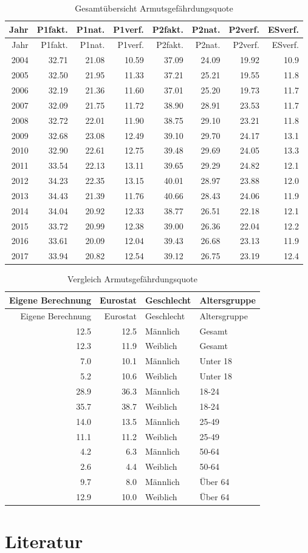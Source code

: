 \documentclass[12pt,]{article}
\begin{document}
\begin{longtable}[]{@{}rrrrrrrr@{}}
\caption{Gesamtübersicht Armutsgefährdungsquote}\tabularnewline
\toprule
Jahr & P1fakt. & P1nat. & P1verf. & P2fakt. & P2nat. & P2verf. &
ESverf.\tabularnewline
\midrule
\endfirsthead
\toprule
Jahr & P1fakt. & P1nat. & P1verf. & P2fakt. & P2nat. & P2verf. &
ESverf.\tabularnewline
\midrule
\endhead
2004 & 32.71 & 21.08 & 10.59 & 37.09 & 24.09 & 19.92 &
10.9\tabularnewline
2005 & 32.50 & 21.95 & 11.33 & 37.21 & 25.21 & 19.55 &
11.8\tabularnewline
2006 & 32.19 & 21.36 & 11.60 & 37.01 & 25.20 & 19.73 &
11.7\tabularnewline
2007 & 32.09 & 21.75 & 11.72 & 38.90 & 28.91 & 23.53 &
11.7\tabularnewline
2008 & 32.72 & 22.01 & 11.90 & 38.75 & 29.10 & 23.21 &
11.8\tabularnewline
2009 & 32.68 & 23.08 & 12.49 & 39.10 & 29.70 & 24.17 &
13.1\tabularnewline
2010 & 32.90 & 22.61 & 12.75 & 39.48 & 29.69 & 24.05 &
13.3\tabularnewline
2011 & 33.54 & 22.13 & 13.11 & 39.65 & 29.29 & 24.82 &
12.1\tabularnewline
2012 & 34.23 & 22.35 & 13.15 & 40.01 & 28.97 & 23.88 &
12.0\tabularnewline
2013 & 34.43 & 21.39 & 11.76 & 40.66 & 28.43 & 24.06 &
11.9\tabularnewline
2014 & 34.04 & 20.92 & 12.33 & 38.77 & 26.51 & 22.18 &
12.1\tabularnewline
2015 & 33.72 & 20.99 & 12.38 & 39.00 & 26.36 & 22.04 &
12.2\tabularnewline
2016 & 33.61 & 20.09 & 12.04 & 39.43 & 26.68 & 23.13 &
11.9\tabularnewline
2017 & 33.94 & 20.82 & 12.54 & 39.12 & 26.75 & 23.19 &
12.4\tabularnewline
\bottomrule
\end{longtable}

\begin{longtable}[]{@{}rrll@{}}
\caption{Vergleich Armutsgefährdungsquote}\tabularnewline
\toprule
Eigene Berechnung & Eurostat & Geschlecht & Altersgruppe\tabularnewline
\midrule
\endfirsthead
\toprule
Eigene Berechnung & Eurostat & Geschlecht & Altersgruppe\tabularnewline
\midrule
\endhead
12.5 & 12.5 & Männlich & Gesamt\tabularnewline
12.3 & 11.9 & Weiblich & Gesamt\tabularnewline
7.0 & 10.1 & Männlich & Unter 18\tabularnewline
5.2 & 10.6 & Weiblich & Unter 18\tabularnewline
28.9 & 36.3 & Männlich & 18-24\tabularnewline
35.7 & 38.7 & Weiblich & 18-24\tabularnewline
14.0 & 13.5 & Männlich & 25-49\tabularnewline
11.1 & 11.2 & Weiblich & 25-49\tabularnewline
4.2 & 6.3 & Männlich & 50-64\tabularnewline
2.6 & 4.4 & Weiblich & 50-64\tabularnewline
9.7 & 8.0 & Männlich & Über 64\tabularnewline
12.9 & 10.0 & Weiblich & Über 64\tabularnewline
\bottomrule
\end{longtable}

\newpage

\section{Literatur}\label{literatur}
\end{document}

